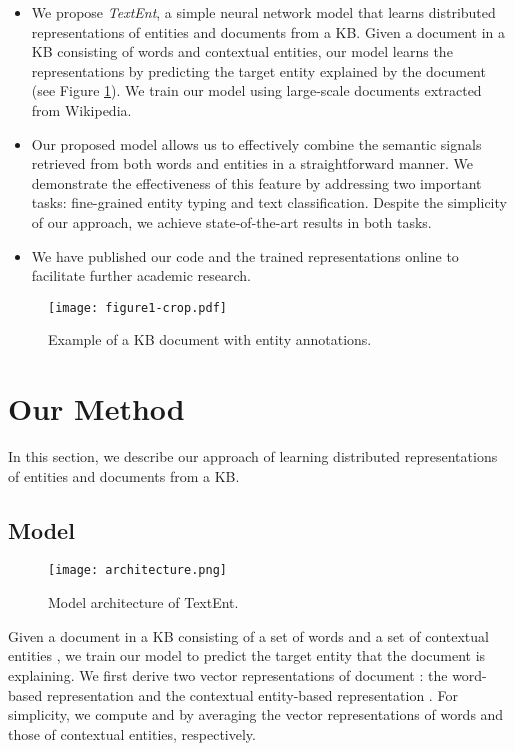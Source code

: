 \documentclass[11pt]{article}
\begin{document}
  \begin{itemize}
    \item We propose \textit{TextEnt}, a simple neural network model that learns distributed representations of entities and documents from a KB.
    Given a document in a KB consisting of words and contextual entities, our model learns the representations by predicting the target entity explained by the document (see Figure \ref{fig:kb-description}).
    We train our model using large-scale documents extracted from Wikipedia.
    \item Our proposed model allows us to effectively combine the semantic signals retrieved from both words and entities in a straightforward manner.
    We demonstrate the effectiveness of this feature by addressing two important tasks: fine-grained entity typing and text classification.
    Despite the simplicity of our approach, we achieve state-of-the-art results in both tasks.
    \item We have published our code and the trained representations online to facilitate further academic research.
  \end{itemize}

  \begin{figure}[t]
    \centering
    \texttt{[image: figure1-crop.pdf]}
    \label{fig:kb-description}
    \caption{Example of a KB document with entity annotations.}
  \end{figure}

  \section{Our Method}

  In this section, we describe our approach of learning distributed representations of entities and documents from a KB.

  \subsection{Model}
  \label{subsec:model}
  \begin{figure}[t]
    \centering
    \texttt{[image: architecture.png]}
    \caption{Model architecture of TextEnt.}
    \label{fig:architecture}
  \end{figure}

  Given a document  in a KB consisting of a set of words  and a set of contextual entities , we train our model to predict the target entity that the document is explaining.
  We first derive two vector representations of document : the word-based representation  and the contextual entity-based representation .
  For simplicity, we compute  and  by averaging the vector representations of words and those of contextual entities, respectively.
  
\end{document}
